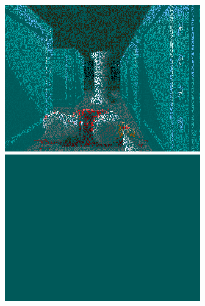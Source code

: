 \begin{minipage}{\textwidth}
\centering
  \includegraphics[width=.9\textwidth]{imgs/fizzlefade/boss/screenshot_102.png}\\
\vspace*{0.5cm}
  \includegraphics[width=.9\textwidth]{imgs/fizzlefade/boss/screenshot_130.png}\\
\end{minipage}


